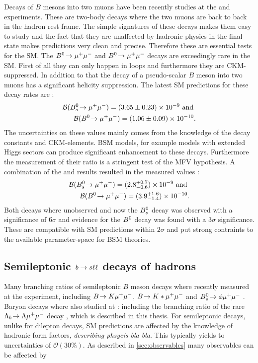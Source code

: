 Decays of $B$ mesons into two muons have been recently studies at the \lhcb and \cms experiments.
These are two-body decays where the two muons are back to back in the hadron rest frame.
The simple signatures of these decays makes them easy to study and the fact that they
are unaffected by hadronic physics in the final state makes predictions very clean and precise.
Therefore these are essential tests for the SM.
The $B^0\!\rightarrow \mu^+\mu^-$ and $B^0\!\rightarrow \mu^+\mu^-$ decays are exceedingly rare in the SM.
First of all they can only happen in loops and furthermore they are CKM-suppressed.
In addition to that the decay of a pseudo-scalar $B$ meson into two muons has a significant helicity suppression.
The latest SM predictions for these decay rates are \cite{}:
%
\begin{align}
\mathcal{B}(B^0_s\!\rightarrow \mu^+\mu^-) = (3.65 \pm 0.23) \times 10^{-9} \text{ and } \\
\mathcal{B}(B^0\!\rightarrow \mu^+\mu^-) = (1.06 \pm 0.09) \times 10^{-10}.
\end{align}
%
The uncertainties on these values mainly comes from the knowledge of the decay constants and CKM-elements.
BSM models, for example models with extended Higgs sectors can produce significant enhancement to
these decays. Furthermore the measurement of their ratio is a stringent test of the MFV hypothesis.
A combination of the \lhcb and \cms results resulted in the measured values \cite{}:
%
\begin{align}
\mathcal{B}(B^0_s\!\rightarrow \mu^+\mu^-) = (2.8^{+0.7}_{-0.6}) \times 10^{-9} \text{ and } \\
\mathcal{B}(B^0\!\rightarrow \mu^+\mu^-) = (3.9^{+1.6}_{-1.4}) \times 10^{-10}.
\end{align}
%
Both decays where unobserved and now the $B^0_s$ decay was observed with a significance of $6\sigma$
and evidence for the $B^0$ decay was found with a $3\sigma$ significance.
These are compatible with SM predictions within $2\sigma$ and put strong contraints to
the available parameter-space for BSM theories.

\subsection{Semileptonic $b\rightarrow s\ell\ell$ decays of \bquark hadrons}

Many branching ratios of semileptonic $B$ meson decays where recently measured at the \lhcb experiment,
including $B\!\rightarrow K\mu^+\mu^-$, $B\!\rightarrow K*\mu^+\mu^-$ and $B^0_s\!\rightarrow \phi\mu^+\mu^-$ \cite{}.
Baryon decays where also studied at \lhcb: including the branching ratio of
the rare $\Lambda_b\!\rightarrow \Lambda\mu^+\mu^-$ decay \cite{}, which is described in this thesis.
For semileptonic decays, unlike for dilepton decays, SM predictions are affected by the
knowledge of hadronic form factors, {\em describing phsycis bla bla}. This typically yields
to uncertainties of $\mathcal{O}(30\%)$.
As described in \ref{sec:observables} many observables can be affected by 


